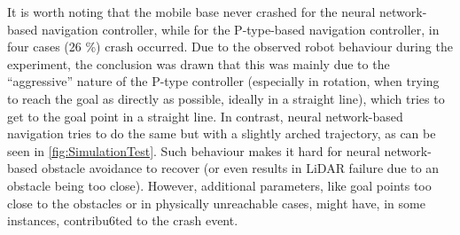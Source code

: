 It is worth noting that the mobile base never crashed for the neural network-based navigation controller, while for the P-type-based navigation controller, in four cases (26 \%) crash occurred. Due to the observed robot behaviour during the experiment, the conclusion was drawn that this was mainly due to the ``aggressive'' nature of the P-type controller (especially in rotation, when trying to reach the goal as directly as possible, ideally in a straight line), which tries to get to the goal point in a straight line. In contrast, neural network-based navigation tries to do the same but with a slightly arched trajectory, as can be seen in \cref{fig:SimulationTest}. Such behaviour makes it hard for neural network-based obstacle avoidance to recover (or even results in LiDAR failure due to an obstacle being too close). However, additional parameters, like goal points too close to the obstacles or in physically unreachable cases, might have, in some instances, contribu6ted to the crash event. 

